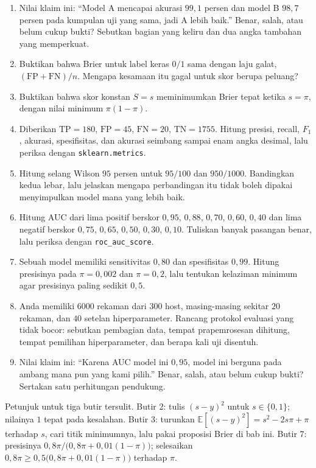 \begin{latihan}
\begin{enumerate}
  \item Nilai klaim ini: ``Model A mencapai akurasi $99{,}1$ persen dan model B $98{,}7$
        persen pada kumpulan uji yang sama, jadi A lebih baik.'' Benar, salah, atau belum
        cukup bukti? Sebutkan bagian yang keliru dan dua angka
        tambahan yang memperkuat.
  \item Buktikan bahwa Brier untuk label keras $0/1$ sama dengan laju galat,
        $(\mathrm{FP}+\mathrm{FN})/n$. Mengapa kesamaan itu gagal untuk skor berupa
        peluang?
  \item Buktikan bahwa skor konstan $S=s$ meminimumkan Brier tepat ketika $s=\pi$, dengan
        nilai minimum $\pi(1-\pi)$.
  \item Diberikan $\mathrm{TP}=180$, $\mathrm{FP}=45$, $\mathrm{FN}=20$,
        $\mathrm{TN}=1755$. Hitung presisi, recall, $F_1$, akurasi, spesifisitas, dan
        akurasi seimbang sampai enam angka desimal, lalu periksa dengan
        \texttt{sklearn.metrics}.
  \item Hitung selang Wilson $95$ persen untuk $95/100$ dan $950/1000$. Bandingkan kedua
        lebar, lalu jelaskan mengapa perbandingan itu tidak boleh dipakai menyimpulkan
        model mana yang lebih baik.
  \item Hitung AUC dari lima positif berskor $0{,}95$, $0{,}88$, $0{,}70$, $0{,}60$,
        $0{,}40$ dan lima negatif berskor $0{,}75$, $0{,}65$, $0{,}50$, $0{,}30$,
        $0{,}10$. Tuliskan banyak pasangan benar, lalu periksa dengan
        \texttt{roc\_auc\_score}.
  \item Sebuah model memiliki sensitivitas $0{,}80$ dan spesifisitas $0{,}99$. Hitung
        presisinya pada $\pi=0{,}002$ dan $\pi=0{,}2$, lalu tentukan kelaziman minimum
        agar presisinya paling sedikit $0{,}5$.
  \item Anda memiliki $6000$ rekaman dari $300$ host, masing-masing sekitar $20$ rekaman,
        dan $40$ setelan hiperparameter. Rancang protokol evaluasi yang tidak bocor:
        sebutkan pembagian data, tempat prapemrosesan dihitung, tempat pemilihan
        hiperparameter, dan berapa kali uji disentuh.
  \item Nilai klaim ini: ``Karena AUC model ini $0{,}95$, model ini berguna pada ambang
        mana pun yang kami pilih.'' Benar, salah, atau belum cukup bukti? Sertakan satu
        perhitungan pendukung.
\end{enumerate}

Petunjuk untuk tiga butir tersulit. Butir 2: tulis $(s-y)^2$ untuk $s\in\{0,1\}$; nilainya
$1$ tepat pada kesalahan. Butir 3: turunkan $\mathbb{E}[(s-y)^2]=s^2-2s\pi+\pi$ terhadap
$s$, cari titik minimumnya, lalu pakai proposisi Brier di bab ini. Butir 7: presisinya
$0{,}8\pi/\bigl(0{,}8\pi+0{,}01(1-\pi)\bigr)$; selesaikan
$0{,}8\pi\ge0{,}5\bigl(0{,}8\pi+0{,}01(1-\pi)\bigr)$ terhadap $\pi$.
\end{latihan}

